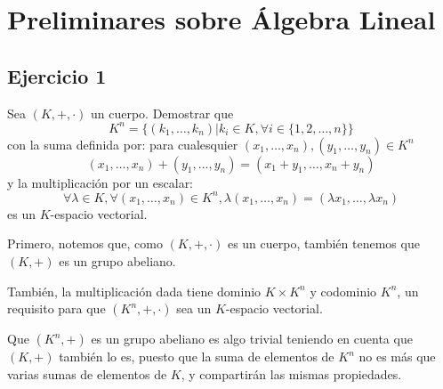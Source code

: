 \chapter{Preliminares sobre Álgebra Lineal}

\section{Ejercicio 1}

\begin{formulationBox}
	Sea $(K, +, \cdot)$ un cuerpo. Demostrar que
	\[K^n = \{(k_1,\dots,k_n)|k_i\in K, \forall i\in\{1, 2, \dots, n\}\}\]
	con la suma definida por: para cualesquier $(x_1, \dots, x_n), (y_1, \dots, y_n) \in K^n$
	\[(x_1, \dots, x_n) + (y_1, \dots, y_n) = (x_1+y_1, \dots, x_n+y_n)\]
	y la multiplicación por un escalar:
	\[\forall\lambda\in K, \forall(x_1, \dots, x_n)\in K^n, \lambda(x_1, \dots, x_n) = (\lambda x_1, \dots, \lambda x_n)\]
	es un $K$-espacio vectorial.
\end{formulationBox}

Primero, notemos que, como $(K, +, \cdot)$ es un cuerpo, también tenemos que $(K, +)$ es un grupo abeliano.

También, la multiplicación dada tiene dominio $K\times K^n$ y codominio $K^n$, un requisito para que $(K^n, +, \cdot)$ sea un $K$-espacio vectorial.

Que $(K^n, +)$ es un grupo abeliano es algo trivial teniendo en cuenta que $(K, +)$ también lo es, puesto que la suma de elementos de $K^n$ no es más que varias sumas de elementos de $K$, y compartirán las mismas propiedades.

